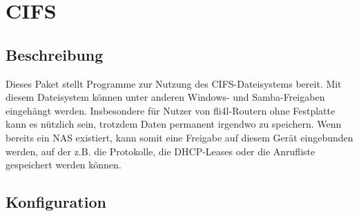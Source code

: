 {
\section {CIFS}
}

\subsection {Beschreibung}
  Dieses Paket stellt Programme zur Nutzung des CIFS-Dateisystems bereit.
  Mit diesem Dateisystem können unter anderen Windows- und Samba-Freigaben
  eingehängt werden. Insbesondere für Nutzer von fli4l-Routern ohne Festplatte
  kann es nützlich sein, trotzdem Daten permanent irgendwo zu speichern. Wenn
  bereits ein NAS existiert, kann somit eine Freigabe auf diesem Gerät
  eingebunden werden, auf der z.B. die Protokolle, die DHCP-Leases oder die
  Anrufliste gespeichert werden können.

\subsection{Konfiguration}

